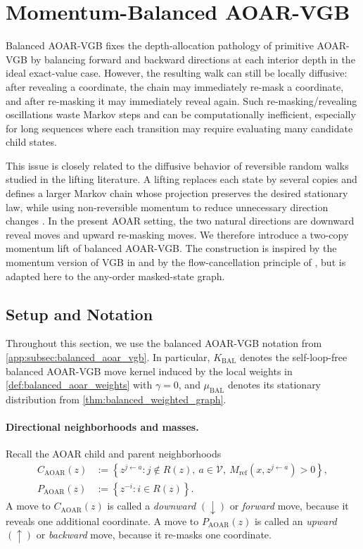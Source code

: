 \documentclass{article}
\numberwithin{theorem}{section}
\numberwithin{proposition}{section}
\numberwithin{corollary}{section}
\numberwithin{lemma}{section}
\numberwithin{conjecture}{section}
\numberwithin{remark}{section}
\numberwithin{definition}{section}
\numberwithin{assumption}{section}
\numberwithin{example}{section}
\newcommand{\calV}{{\mathcal{V}}}
\newcommand{\mbra}[1]{\left\{#1\right\}}
\begin{document}
\section{Momentum-Balanced AOAR-VGB}
\label{app:sec:momentum_balanced_aoar_vgb}

Balanced AOAR-VGB fixes the depth-allocation pathology of primitive AOAR-VGB by balancing forward and backward directions at each interior depth in the ideal exact-value case. However, the resulting walk can still be locally diffusive: after revealing a coordinate, the chain may immediately re-mask a coordinate, and after re-masking it may immediately reveal again. Such re-masking/revealing oscillations waste Markov steps and can be computationally inefficient, especially for long sequences where each transition may require evaluating many candidate child states.

This issue is closely related to the diffusive behavior of reversible random walks studied in the lifting literature. A lifting replaces each state by several copies and defines a larger Markov chain whose projection preserves the desired stationary law, while using non-reversible momentum to reduce unnecessary direction changes \citep{hayes2010liftings}. In the present AOAR setting, the two natural directions are downward reveal moves and upward re-masking moves. We therefore introduce a two-copy momentum lift of balanced AOAR-VGB. The construction is inspired by the momentum version of VGB in \citet{rohatgi2025taming} and by the flow-cancellation principle of \citet{hayes2010liftings}, but is adapted here to the any-order masked-state graph.

\subsection{Setup and Notation}
\label{app:subsec:momentum_balanced_setup}

Throughout this section, we use the balanced AOAR-VGB notation from \cref{app:subsec:balanced_aoar_vgb}. In particular, $K_{\mathrm{BAL}}$ denotes the self-loop-free balanced AOAR-VGB move kernel induced by the local weights in \cref{def:balanced_aoar_weights} with $\gamma=0$, and $\mu_{\mathrm{BAL}}$ denotes its stationary distribution from \cref{thm:balanced_weighted_graph}.

\paragraph{Directional neighborhoods and masses.}
Recall the AOAR child and parent neighborhoods
\begin{align*}
    C_{\mathrm{AOAR}}(z) &:= \mbra{z^{j\leftarrow a}: j\notin R(z),\ a\in\calV,\ M_{\mathrm{ref}}(x,z^{j\leftarrow a})>0},\\
    P_{\mathrm{AOAR}}(z) &:= \mbra{z^{-i}: i\in R(z)}.
\end{align*}
A move to $C_{\mathrm{AOAR}}(z)$ is called a \emph{downward} $(\downarrow)$ or \emph{forward} move, because it reveals one additional coordinate. A move to $P_{\mathrm{AOAR}}(z)$ is called an \emph{upward} $(\uparrow)$ or \emph{backward} move, because it re-masks one coordinate.
\end{document}
